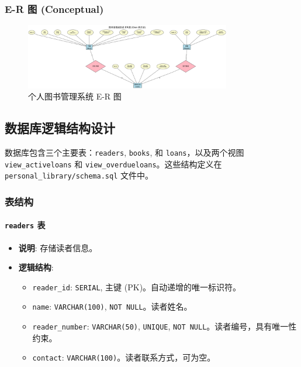\documentclass[11pt, a4paper]{article}
\begin{document}
\subsubsection*{E-R 图 (Conceptual)}
\begin{figure}[htbp]
    \centering
    \includegraphics[width=0.8\textwidth]{library_chen_er_diagram.png} %
    \caption{个人图书管理系统 E-R 图}
    \label{fig:er_diagram}
\end{figure}

\subsection{数据库逻辑结构设计}
数据库包含三个主要表：\texttt{readers}, \texttt{books}, 和 \texttt{loans}，以及两个视图 \texttt{view\_activeloans} 和 \texttt{view\_overdueloans}。这些结构定义在 \texttt{personal\_library/schema.sql} 文件中。

\subsubsection{表结构}
\paragraph{\texttt{readers} 表}
\begin{itemize}
    \item \textbf{说明}: 存储读者信息。
    \item \textbf{逻辑结构}:
    \begin{itemize}
        \item \texttt{reader\_id}: \texttt{SERIAL}, 主键 (PK)。自动递增的唯一标识符。
        \item \texttt{name}: \texttt{VARCHAR(100)}, \texttt{NOT NULL}。读者姓名。
        \item \texttt{reader\_number}: \texttt{VARCHAR(50)}, \texttt{UNIQUE}, \texttt{NOT NULL}。读者编号，具有唯一性约束。
        \item \texttt{contact}: \texttt{VARCHAR(100)}。读者联系方式，可为空。
    \end{itemize}
\end{itemize}
\end{document}
